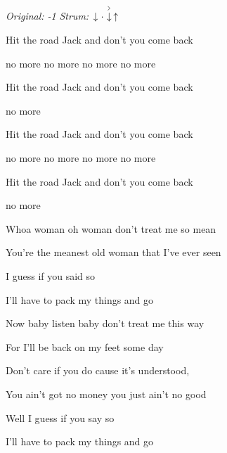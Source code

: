 \begin{song}


\begin{headerbox}
\RaiseBoxWithAccents
{} \quad
\textit{Original: -1} \quad
\textit{Strum:} $\Down\Miss\AccentDown\Up$
\end{headerbox}

\begin{hchordbox}
\end{hchordbox}

\Large

\bigskip

\begin{chorusbox}{\Chorus}
Hit the road Jack and don't you come back \par
no more no more no more no more \par
Hit the road Jack and don't you come back \par
no more    \par

\bigskip

Hit the road Jack and don't you come back \par
no more no more no more no more \par
Hit the road Jack and don't you come back \par
no more    \par
\end{chorusbox}

\bigskip

Whoa woman oh woman don't treat me so mean \par
You're the meanest old woman that I've ever seen \par
I guess if you said so  \par
I'll have to pack my things and go  \par

\bigskip

\Chorus

\bigskip

Now baby listen baby don't treat me this way \par
For I'll be back on my feet some day \par
Don't care if you do cause it's understood, \par
You ain't got no money you just ain't no good \par
Well I guess if you say so  \par
I'll have to pack my things and go  \par


\end{song}
